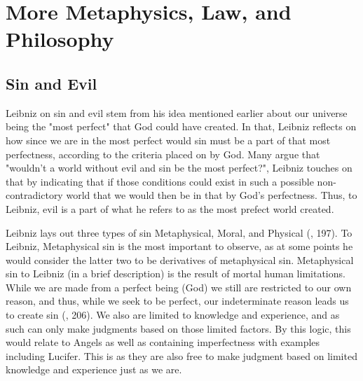 \documentclass[12pt]{report}
\begin{document}
\chapter{More Metaphysics, Law, and Philosophy}
    
\section*{Sin and Evil}
Leibniz on sin and evil stem from his idea mentioned earlier about our universe being the "most perfect" that God could have created.
In that, Leibniz reflects on how since we are in the most perfect would sin must be a part of that most perfectness, according to the criteria placed on by God.
Many argue that "wouldn't a world without evil and sin be the most perfect?", Leibniz touches on that by indicating that if those conditions could exist in such a possible non-contradictory world that we would then be in that by God's perfectness.
Thus, to Leibniz, evil is a part of what he refers to as the most prefect world created.\\ \par
Leibniz lays out three types of sin Metaphysical, Moral, and Physical (\citeauthor{Russell}, 197).
To Leibniz, Metaphysical sin is the most important to observe, as at some points he would consider the latter two to be derivatives of metaphysical sin.
Metaphysical sin to Leibniz (in a brief description) is the result of mortal human limitations.
While we are made from a perfect being (God) we still are restricted to our own reason, and thus, while we seek to be perfect, our indeterminate reason leads us to create sin (\citeauthor{Strickland}, 206).
We also are limited to knowledge and experience, and as such can only make judgments based on those limited factors. 
By this logic, this would relate to Angels as well as containing imperfectness with examples including Lucifer. This is as they are also free to make judgment based on limited knowledge and experience just as we are.
\end{document}
